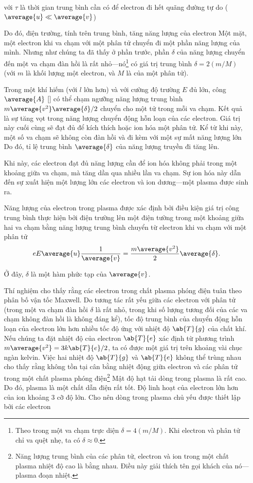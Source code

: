 \noindent
với $\tau$ là thời gian trung bình cần có để electron đi hết quãng đường tự do ($\average{u} \ll \average{v}$)

Do đó, điện trường, tính trên trung bình, tăng năng lượng của electron
Một mặt, một electron khi va chạm với một phân tử chuyển đi một phần năng lượng của mình.
Nhưng như chúng ta đã thấy ở phần trước, phần $\delta$ của năng lượng chuyển đến một va chạm đàn hồi là rất nhỏ---nó\footnote{Theo  trong một va chạm trực diện $\delta = 4(m/M)$. Khi electron và phân tử chỉ va quệt nhẹ, ta có $\delta\approx 0$.} có giá trị trung bình $\delta = 2(m/M)$ (với $m$ là khối lượng một electron, và $M$ là của một phân tử). 

Trong một khí hiếm (với $l$ lớn hơn) và với cường độ trường $E$ đủ lớn, công $\average{A}$ [] có thể chạm ngưỡng năng lượng trung bình $m\average{v^2}\average{\delta}/2$ chuyển cho một tử trong mỗi va chạm.
Kết quả là sự tăng vọt trong năng lượng chuyển động hỗn loạn của các electron.
Giá trị này cuối cùng sẽ đạt đủ để kích thích hoặc ion hóa một phân tử.
Kể từ khi này, một số va chạm sẽ không còn đàn hồi và đi kèm với một sự mất năng lượng lớn
Do đó, tỉ lệ trung bình $\average{\delta}$ của năng lượng truyền đi tăng lên.

Khi này, các electron đạt đủ năng lượng cần để ion hóa không phải trong một khoảng giữa va chạm, mà tăng dần qua nhiều lần va chạm.
Sự ion hóa này dẫn đến sự xuất hiện một lượng lớn các electron và ion dương---một plasma được sinh ra.

Năng lượng của electron trong plasma được xác định bởi điều kiện giá trị công trung bình thực hiện bởi điện trường lên một điện tường trong một khoảng giữa hai va chạm bằng năng lượng trung bình chuyển từ electron khi va chạm với một phân tử
\begin{equation*}
    e E \average{u} \frac{1}{\average{v}} = \frac{m \average{v^2}}{2} \average{\delta}.
\end{equation*}

\noindent
Ở đây, $\delta$ là một hàm phức tạp của $\average{v}$.

Thí nghiệm cho thấy rằng các electron trong chất plasma phóng điện tuân theo phân bố vận tốc Maxwell.
Do tương tác rất yếu giữa các electron với phân tử (trong một va chạm đàn hồi $\delta$ là rất nhỏ, trong khi số lượng tương đối của các va chạm không đàn hồi là không đáng kể), tốc độ trung bình của chuyển động hỗn loạn của electron lớn hơn nhiều tốc độ ứng với nhiệt độ $\ab{T}{g}$ của chất khí.
Nếu chúng ta đặt nhiệt độ của electron $\ab{T}{e}$ xác định từ phương trình $m\average{v^2} = 3k\ab{T}{e}/2$, ta có được một giá trị trên khoảng vài chục ngàn kelvin.
Việc hai nhiệt độ $\ab{T}{g}$ và $\ab{T}{e}$ không thể trùng nhau cho thấy rằng không tồn tại cân bằng nhiệt động giữa electron và các phân tử trong một chất plasma phóng điện\footnote{Năng lượng trung bình của các phân tử, electron và ion trong một chất plasma nhiệt độ cao là bằng nhau. Điều này giải thích tên gọi khách của nó---plasma đoạn nhiệt.}
Mật độ hạt tải dòng trong plasma là rất cao.
Do đó, plasma là một chất dẫn điện rất tốt.
Độ linh hoạt của electron lớn hơn của ion khoảng 3 cỡ độ lớn.
Cho nên dòng trong plasma chủ yếu được thiết lập bởi các electron

